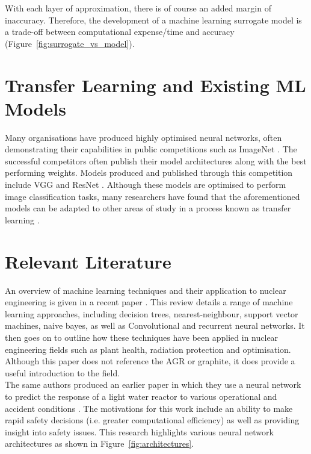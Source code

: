 \noindent With each layer of approximation, there is of course an added margin of inaccuracy. Therefore, the development of a machine learning surrogate model is a trade-off between computational expense/time and accuracy (Figure~\ref{fig:surrogate_vs_model}).

\section{Transfer Learning and Existing ML Models} \label{transfer}

Many organisations have produced highly optimised neural networks, often demonstrating their capabilities in public competitions such as ImageNet \cite{russakovsky2015imagenet}. The successful competitors often publish their model architectures along with the best performing weights. Models produced and published through this competition include VGG \cite{simonyan2014very} and ResNet \cite{he2015deep}. Although these models are optimised to perform image classification tasks, many researchers have found that the aforementioned models can be adapted to other areas of study in a process known as transfer learning \cite{tan2018survey}.

\section{Relevant Literature} \label{MLlit}

An overview of machine learning techniques and their application to nuclear engineering is given in a recent paper \cite{gomez2020status}. This review details a range of machine learning approaches, including decision trees, nearest-neighbour, support vector machines, naive bayes, as well as Convolutional and recurrent neural networks. It then goes on to outline how these techniques have been applied in nuclear engineering fields such as plant health, radiation protection and optimisation. Although this paper does not reference the AGR or graphite, it does provide a useful introduction to the field. 
\\

\noindent
The same authors produced an earlier paper in which they use a neural network to predict the response of a light water reactor to various operational and accident conditions \cite{fernandez2017nuclear}. The motivations for this work include an ability to make rapid safety decisions (i.e. greater computational efficiency) as well as providing insight into safety issues. This research highlights various neural network architectures as shown in Figure~\ref{fig:architectures}.  
\\

